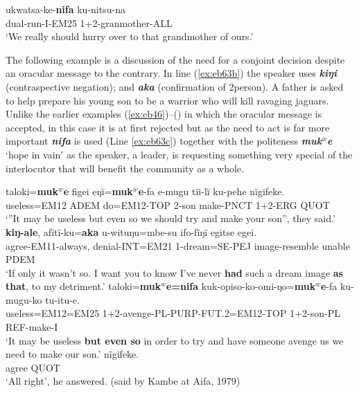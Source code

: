 \documentclass[output=paper]{langsci/langscibook}
\begin{document}
\begin{exe}
	\ex \label{ex:eb62}
	\gll ukwatsa-ke-\textbf{nifa} ku-nitsu-na\\ 
	dual-run-I-EM25 1+2-granmother-ALL\\
	\trans ‘We really should hurry over to that grandmother of ours.’
\end{exe}

The following example is a discussion of the need for a conjoint decision despite an oracular message to the contrary. In line (\ref{ex:eb63b}) the speaker uses \textbf{\textit{kiŋi}} (contraspective negation); and \textbf{\textit{aka}} (confirmation of 2person).  A father is asked to help prepare his young son  to be a warrior who will kill ravaging jaguars.  Unlike the earlier examples (\ref{ex:eb46})--(\label{ex:eb49}) in which the oracular message is accepted, in this case it is at first rejected but as the need to act is far more important  \textbf{\textit{nifa}} is used (Line \ref{ex:eb63c}) together with the politeness  \textbf{\textit{muk$^w$e}} ‘hope in vain’ as the speaker, a leader,  is requesting something very special of the interlocutor that will benefit the community as a whole. 

\begin{exe}
\ex \label{ex:eb63}
	\begin{xlist}
	\ex \label{ex:eb63a}
	\gll taloki=\textbf{muk$^w$e} figei eŋï=\textbf{muk$^w$e}-fa e-mugu tïi-lï ku-pehe nïgifeke.\\
	useless=EM12 ADEM do=EM12-TOP 2-son make-PNCT 1+2-ERG QUOT\\
	\trans ‘”It may be useless but even so we should try and make your son”, they said.’
	\ex \label{ex:eb63b}
	 \textbf{kiŋ-ale}, afïtï-ku=\textbf{aka} u-wituŋu=mbe-su ifo-fïŋï egitse egei.\\
	agree-EM11-always, denial-INT=EM21 1-dream=SE-PEJ image-resemble unable PDEM\\
	\trans ‘If only it wasn’t so.  I want you to know I’ve never \textbf{had} such a dream image \textbf{as that}, to my detriment.’
	\ex \label{ex:eb63c}
	\gll taloki=\textbf{muk$^w$e=nifa} kuk-opiso-ko-omi-ŋo=\textbf{muk$^w$e}-fa ku-mugu-ko tu-itu-e.\\
	useless=EM12=EM25 1+2-avenge-PL-PURP-FUT.2=EM12-TOP 1+2-son-PL REF-make-I\\
	\trans ‘It may be useless \textbf{but even so} in order to try and have someone avenge us we need to make our son.’
	\ex \label{ex:eb63d}
	 nïgifeke.\\
	agree QUOT\\
	\trans ‘All right’, he answered. (said by Kambe at Aifa, 1979)
\end{xlist}
\end{exe}
\end{document}
